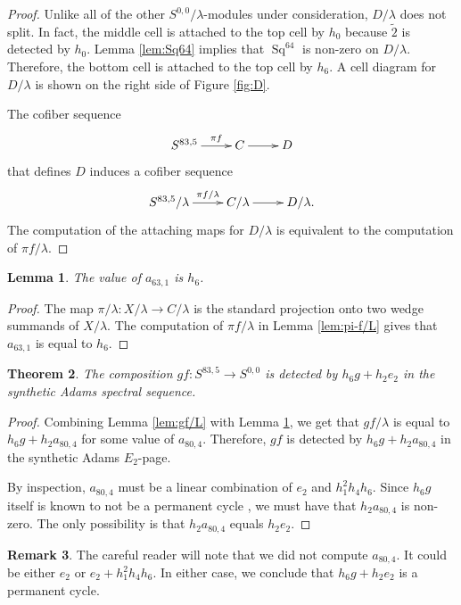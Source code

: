 \documentclass{amsart}
\newtheorem{thm}{Theorem}[section]
\newtheorem{lemma}[thm]{Lemma}
\theoremstyle{definition}
\newtheorem{rmk}[thm]{Remark}
\newcommand{\map}{\rightarrow}
\newcommand{\Xonefour}{C}
\newcommand{\hsf}{\widetilde{2}}
\DeclareMathOperator{\Sq}{Sq}
\begin{document}
\begin{proof}
Unlike all of the other $S^{0,0}/\lambda$-modules under consideration,
$D/\lambda$ does not split.  In fact, the middle cell is attached
to the top cell by $h_0$ because $\hsf$ is detected by $h_0$.
Lemma \ref{lem:Sq64} implies that 
$\Sq^{64}$ is non-zero on $D/\lambda$.
Therefore, the bottom cell is attached to the top cell by $h_6$.
A cell diagram for $D/\lambda$ is shown on the right side
of Figure \ref{fig:D}.


The cofiber sequence 
\[
\xymatrix{
S^{83,5} \ar[r]^-{\pi f} & \Xonefour \ar[r] & D
}
\]
that defines $D$ induces a cofiber sequence
\[
\xymatrix{
S^{83,5}/\lambda \ar[r]^-{\pi f/\lambda} & \Xonefour/\lambda \ar[r] & D/\lambda.
}
\]
The computation of the attaching maps for $D/\lambda$ is equivalent
to the computation of $\pi f/\lambda$.
\end{proof}




\begin{lemma}
\label{lem:a63,1}
The value of $a_{63,1}$ is $h_6$.
\end{lemma}

\begin{proof}
The map $\pi/\lambda: X/\lambda \map \Xonefour/\lambda$
is the standard projection onto two wedge summands of
$X/\lambda$.  The computation of
$\pi f/\lambda$ in Lemma \ref{lem:pi-f/L} 
gives that $a_{63,1}$ is equal to $h_6$.
\end{proof}


\begin{thm} \label{thm:perm-h6g+h2e2}
The composition $g f: S^{83,5} \map S^{0,0}$
is detected by $h_6 g + h_2 e_2$ in the synthetic Adams spectral
sequence.
\end{thm}

\begin{proof}
Combining Lemma \ref{lem:gf/L} with Lemma \ref{lem:a63,1},
we get that $g f/\lambda$ is
equal to $h_6 g + h_2 a_{80,4}$ for some value of $a_{80,4}$.
Therefore,
$g f$ is detected by $h_6 g + h_2 a_{80,4}$ in the synthetic
Adams $E_2$-page.

By inspection, $a_{80,4}$ must be a linear combination of 
$e_2$ and $h_1^2 h_4 h_6$.
Since $h_6 g$ itself is known to not
be a permanent cycle \cite{IWX}, 
we must have that $h_2 a_{80,4}$ is non-zero.  The only possibility
is that $h_2 a_{80,4}$ equals $h_2 e_2$.
\end{proof}

\begin{rmk}
The careful reader will note that we did not compute $a_{80,4}$.
It could be either $e_2$ or $e_2 + h_1^2 h_4 h_6$.  In either case,
we conclude that $h_6 g + h_2 e_2$ is a permanent cycle.
\end{rmk} 
\end{document}
